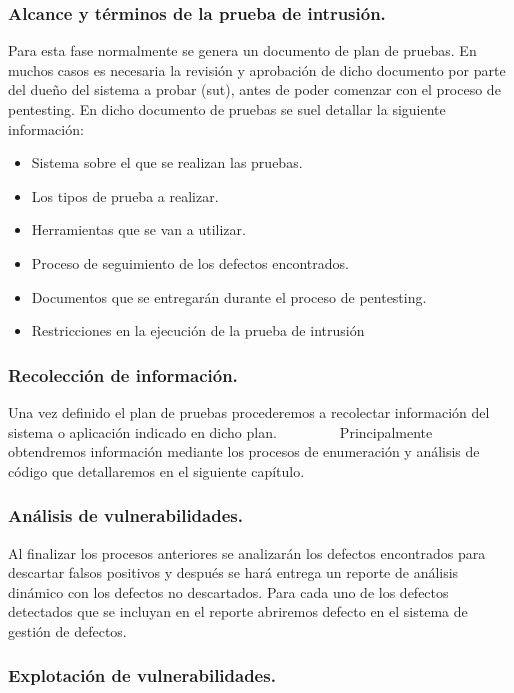 \subsubsection{Alcance y términos de la prueba de intrusión.}  
Para esta fase normalmente se genera un documento de plan de pruebas. En muchos casos es 
necesaria la revisión y aprobación de dicho documento por parte del dueño del sistema a probar 
(\gls{sut}), antes de poder comenzar con el proceso de pentesting.
    En dicho documento de pruebas se suel detallar la siguiente información:
    \begin{itemize}
        \item Sistema sobre el que se realizan las pruebas.
        \item Los tipos de prueba a realizar.
        \item Herramientas que se van a utilizar.
        \item Proceso de seguimiento de los defectos encontrados.
        \item Documentos que se entregarán durante el proceso de pentesting.
        \item Restricciones en la ejecución de la prueba de intrusión
    \end{itemize}

\subsubsection{Recolección de información.}
Una vez definido el plan de pruebas procederemos a recolectar información 
del sistema o aplicación indicado en dicho plan. 
        
Principalmente obtendremos información mediante los procesos de enumeración y 
análisis de código que detallaremos en el siguiente capítulo. 

\subsubsection{Análisis de vulnerabilidades.}
Al finalizar los procesos anteriores se analizarán los defectos encontrados para descartar falsos positivos y 
después se hará entrega un reporte de análisis dinámico con los defectos no descartados. 
Para cada uno de los defectos detectados que se incluyan en el reporte abriremos defecto en el sistema de gestión de defectos.

\subsubsection{Explotación de vulnerabilidades.}

